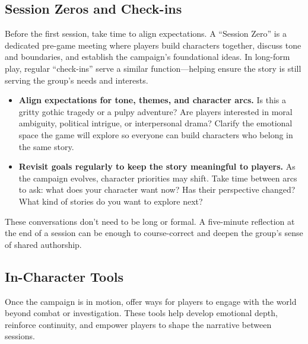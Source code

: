 \subsection*{Session Zeros and Check-ins}

Before the first session, take time to align expectations. A “Session Zero” is a dedicated pre-game meeting where players build characters together, discuss tone and boundaries, and establish the campaign’s foundational ideas. In long-form play, regular “check-ins” serve a similar function—helping ensure the story is still serving the group’s needs and interests.

\begin{itemize}
    \item \textbf{Align expectations for tone, themes, and character arcs.}  
    Is this a gritty gothic tragedy or a pulpy adventure? Are players interested in moral ambiguity, political intrigue, or interpersonal drama? Clarify the emotional space the game will explore so everyone can build characters who belong in the same story.

    \item \textbf{Revisit goals regularly to keep the story meaningful to players.}  
    As the campaign evolves, character priorities may shift. Take time between arcs to ask: what does your character want now? Has their perspective changed? What kind of stories do you want to explore next?
\end{itemize}

These conversations don’t need to be long or formal. A five-minute reflection at the end of a session can be enough to course-correct and deepen the group’s sense of shared authorship.

\subsection*{In-Character Tools}

Once the campaign is in motion, offer ways for players to engage with the world beyond combat or investigation. These tools help develop emotional depth, reinforce continuity, and empower players to shape the narrative between sessions.

